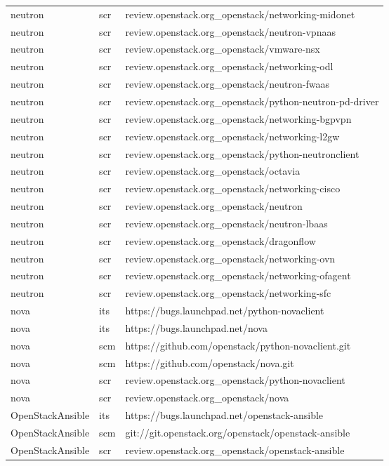 \begin{center}
\begin{longtable}{|p{4cm}|p{1cm}|p{10cm}|}
neutron&scr&review.openstack.org\_openstack/networking-midonet\\ 
neutron&scr&review.openstack.org\_openstack/neutron-vpnaas\\ 
neutron&scr&review.openstack.org\_openstack/vmware-nsx\\ 
neutron&scr&review.openstack.org\_openstack/networking-odl\\ 
neutron&scr&review.openstack.org\_openstack/neutron-fwaas\\ 
neutron&scr&review.openstack.org\_openstack/python-neutron-pd-driver\\ 
neutron&scr&review.openstack.org\_openstack/networking-bgpvpn\\ 
neutron&scr&review.openstack.org\_openstack/networking-l2gw\\ 
neutron&scr&review.openstack.org\_openstack/python-neutronclient\\ 
neutron&scr&review.openstack.org\_openstack/octavia\\ 
neutron&scr&review.openstack.org\_openstack/networking-cisco\\ 
neutron&scr&review.openstack.org\_openstack/neutron\\ 
neutron&scr&review.openstack.org\_openstack/neutron-lbaas\\ 
neutron&scr&review.openstack.org\_openstack/dragonflow\\ 
neutron&scr&review.openstack.org\_openstack/networking-ovn\\ 
neutron&scr&review.openstack.org\_openstack/networking-ofagent\\ 
neutron&scr&review.openstack.org\_openstack/networking-sfc\\ 
nova&its&https://bugs.launchpad.net/python-novaclient\\ 
nova&its&https://bugs.launchpad.net/nova\\ 
nova&scm&https://github.com/openstack/python-novaclient.git\\ 
nova&scm&https://github.com/openstack/nova.git\\ 
nova&scr&review.openstack.org\_openstack/python-novaclient\\ 
nova&scr&review.openstack.org\_openstack/nova\\ 
OpenStackAnsible&its&https://bugs.launchpad.net/openstack-ansible\\ 
OpenStackAnsible&scm&git://git.openstack.org/openstack/openstack-ansible\\ 
OpenStackAnsible&scr&review.openstack.org\_openstack/openstack-ansible\\ 

\end{longtable}
\end{center}
